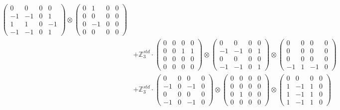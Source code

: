\documentclass{article}
\begin{document}
{\begin{align}
            \begin{pmatrix} 0 & 0 & 0 & 0 \\ -1 & -1 & 0 & 1 \\ 1 & 1 & 0 & -1 \\ -1 & -1 & 0 & 1 \end{pmatrix} \otimes 
            \begin{pmatrix} 0 & 1 & 0 & 0 \\ 0 & 0 & 0 & 0 \\ 0 & -1 & 0 & 0 \\ 0 & 0 & 0 & 0 \end{pmatrix} \\ 
        &+ \label{Rs16-Rc11-Solution-28-c20} \mathbb{Z}_3^{std} \cdot 
            \begin{pmatrix} 0 & 0 & 0 & 0 \\ 0 & 0 & 1 & 1 \\ 0 & 0 & 0 & 0 \\ 0 & 0 & 0 & 0 \end{pmatrix} \otimes 
            \begin{pmatrix} 0 & 0 & 0 & 0 \\ -1 & -1 & 0 & 1 \\ 0 & 0 & 0 & 0 \\ -1 & -1 & 0 & 1 \end{pmatrix} \otimes 
            \begin{pmatrix} 0 & 0 & 0 & 0 \\ 0 & 0 & 0 & 0 \\ 0 & 0 & 0 & 0 \\ -1 & 1 & -1 & 0 \end{pmatrix} \\ 
        &+ \label{Rs16-Rc11-Solution-28-c21} \mathbb{Z}_3^{std} \cdot 
            \begin{pmatrix} 0 & 0 & 0 & 0 \\ -1 & 0 & -1 & 0 \\ 0 & 0 & 0 & 0 \\ -1 & 0 & -1 & 0 \end{pmatrix} \otimes 
            \begin{pmatrix} 0 & 0 & 0 & 0 \\ 0 & 0 & 0 & 0 \\ 0 & 1 & 0 & 0 \\ 0 & 0 & 0 & 0 \end{pmatrix} \otimes 
            \begin{pmatrix} 0 & 0 & 0 & 0 \\ 1 & -1 & 1 & 0 \\ 1 & -1 & 1 & 0 \\ 1 & -1 & 1 & 0 \end{pmatrix} \\ 

\end{align}}
\end{document}
